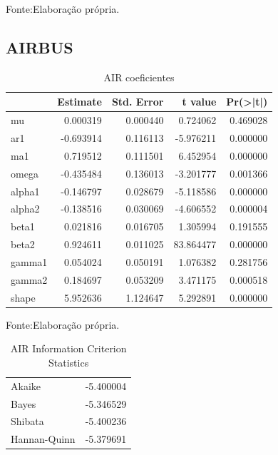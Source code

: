 \documentclass[
  12pt,
  a4paper,
  openany]{book}
\begin{document}
Fonte:Elaboração própria.

\justifying
\bigskip

\hypertarget{airbus}{%
\subsection{AIRBUS}\label{airbus}}

\begin{table}[!h]

\caption{\label{tab:unnamed-chunk-33}AIR coeficientes}
\centering
\begin{tabular}[t]{lrrrr}
\toprule
  &  Estimate &  Std. Error &  t value & Pr(>|t|)\\
\midrule
mu & 0.000319 & 0.000440 & 0.724062 & 0.469028\\
ar1 & -0.693914 & 0.116113 & -5.976211 & 0.000000\\
ma1 & 0.719512 & 0.111501 & 6.452954 & 0.000000\\
omega & -0.435484 & 0.136013 & -3.201777 & 0.001366\\
alpha1 & -0.146797 & 0.028679 & -5.118586 & 0.000000\\
\addlinespace
alpha2 & -0.138516 & 0.030069 & -4.606552 & 0.000004\\
beta1 & 0.021816 & 0.016705 & 1.305994 & 0.191555\\
beta2 & 0.924611 & 0.011025 & 83.864477 & 0.000000\\
gamma1 & 0.054024 & 0.050191 & 1.076382 & 0.281756\\
gamma2 & 0.184697 & 0.053209 & 3.471175 & 0.000518\\
\addlinespace
shape & 5.952636 & 1.124647 & 5.292891 & 0.000000\\
\bottomrule
\end{tabular}
\end{table}
\FloatBarrier
\centering

Fonte:Elaboração própria.

\justifying
\bigskip

\begin{table}[!h]

\caption{\label{tab:unnamed-chunk-34}AIR Information Criterion Statistics}
\centering
\begin{tabular}[t]{lr}
\toprule
  & \\
\midrule
Akaike & -5.400004\\
Bayes & -5.346529\\
Shibata & -5.400236\\
Hannan-Quinn & -5.379691\\
\bottomrule
\end{tabular}
\end{table}
\FloatBarrier
\centering
\end{document}
